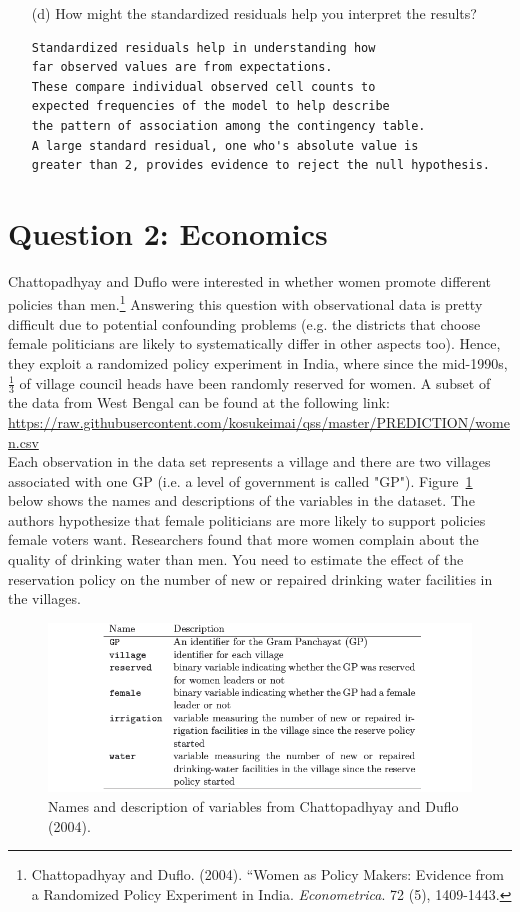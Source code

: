 \documentclass[12pt,letterpaper]{article}
\begin{document}
\begin{enumerate}
	\item [(d)] How might the standardized residuals help you interpret the results?  
\begin{Verbatim}
Standardized residuals help in understanding how 
far observed values are from expectations. 
These compare individual observed cell counts to 
expected frequencies of the model to help describe 
the pattern of association among the contingency table.
A large standard residual, one who's absolute value is 
greater than 2, provides evidence to reject the null hypothesis.   
\end{Verbatim}
\end{enumerate}
\newpage

\section*{Question 2: Economics}
Chattopadhyay and Duflo were interested in whether women promote different policies than men.\footnote{Chattopadhyay and Duflo. (2004). ``Women as Policy Makers: Evidence from a Randomized Policy Experiment in India. \textit{Econometrica}. 72 (5), 1409-1443.} Answering this question with observational data is pretty difficult due to potential confounding problems (e.g. the districts that choose female politicians are likely to systematically differ in other aspects too). Hence, they exploit a randomized policy experiment in India, where since the mid-1990s, $\frac{1}{3}$ of village council heads have been randomly reserved for women. A subset of the data from West Bengal can be found at the following link: \url{https://raw.githubusercontent.com/kosukeimai/qss/master/PREDICTION/women.csv}\\

\noindent Each observation in the data set represents a village and there are two villages associated with one GP (i.e. a level of government is called "GP"). Figure~\ref{fig:women_desc} below shows the names and descriptions of the variables in the dataset. The authors hypothesize that female politicians are more likely to support policies female voters want. Researchers found that more women complain about the quality of drinking water than men. You need to estimate the effect of the reservation policy on the number of new or repaired drinking water facilities in the villages.
\vspace{.5cm}
\begin{figure}[h!]
	\caption{\footnotesize{Names and description of variables from Chattopadhyay and Duflo (2004).}}
	\vspace{.5cm}
	\centering
	\label{fig:women_desc}
	\includegraphics[width=1.1\textwidth]{women_desc.png}
\end{figure}		
\end{document}
